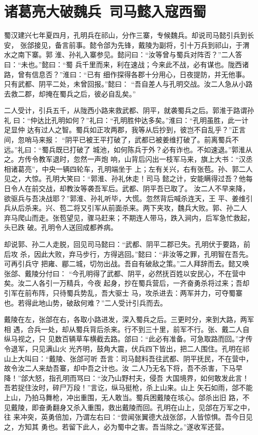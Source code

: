 \chapter{诸葛亮大破魏兵~司马懿入寇西蜀}

蜀汉建兴七年夏四月，孔明兵在祁山，分作三寨，专候魏兵。却说司马懿引兵到长安，
张郃接见，备言前事。懿令郃为先锋，戴陵为副将，引十万兵到祁山，于渭水之南下寨。郭
淮、孙礼入寨参见。懿问曰：“汝等曾与蜀兵对阵否？”二人答曰：“未也。”懿曰：“蜀
兵千里而来，利在速战；今来此不战，必有谋也。陇西诸路，曾有信息否？”淮曰：“已有
细作探得各郡十分用心，日夜提防，并无他事。只有武都、阴平二处，未曾回报。”懿曰：
“吾自差人与孔明交战。汝二人急从小路去救二郡，却掩在蜀兵之后，彼必自乱矣。”

二人受计，引兵五千，从陇西小路来救武都、阴平，就袭蜀兵之后。郭淮于路谓孙礼
曰：“仲达比孔明如何？”礼曰：“孔明胜仲达多矣。”淮曰：“孔明虽胜，此一计足显仲
达有过人之智。蜀兵如正攻两郡，我等从后抄到，彼岂不自乱乎？”正言间，忽哨马来报：
“阴平已被王平打破了，武都已被姜维打破了。前离蜀兵不远。”礼曰：“蜀兵既已打破了
城池，如何陈兵于外？必有诈也。不如速退。”郭淮从之。方传令教军退时，忽然一声炮
响，山背后闪出一枝军马来，旗上大书：“汉丞相诸葛亮”，中央一辆四轮车，孔明端坐于
上；左有关兴，右有张苞。孙、郭二人见之，大惊。孔明大笑曰：“郭淮、孙礼休走！司马
懿之计，安能瞒得过吾？他每日令人在前交战，却教汝等袭吾军后。武都、阴平吾已取了。
汝二人不早来降，欲驱兵与吾决战耶？”郭淮、孙礼听毕，大慌。忽然背后喊杀连天，王
平、姜维引兵从后杀来。兴、苞二将又引军从前面杀来。两下夹攻，魏兵大败。郭、孙二人
弃马爬山而走。张苞望见，骤马赶来；不期连人带马，跌入涧内，后军急忙救起，头已跌
破。孔明令人送回成都养病。

却说郭、孙二人走脱，回见司马懿曰：“武都、阴平二郡已失。孔明伏于要路，前后攻
杀，因此大败，弃马步行，方得逃回。”懿曰：“非汝等之罪，孔明智在吾先。可再引兵守
把雍、郿二城，切勿出战。吾自有破敌之策。”二人拜辞而去。懿又唤张郃、戴陵分付曰：
“今孔明得了武都、阴平，必然抚百姓以安民心，不在营中矣。汝二人各引一万精兵，今夜
起身，抄在蜀兵营后，一齐奋勇杀将过来；吾却引军在前布阵，只待蜀兵势乱，吾大驱士
马，攻杀进去：两军并力，可夺蜀寨也。若得此地山势，破敌何难？”二人受计引兵而去。

戴陵在左，张郃在右，各取小路进发，深入蜀兵之后。三更时分，来到大路，两军相
遇，合兵一处，却从蜀兵背后杀来。行不到三十里，前军不行。张、戴二人自纵马视之，只
见数百辆草车横截去路。郃曰：“此必有准备。可急取路而回。”才传令退军，只见满山火
光齐明，鼓角大震，伏兵四下皆出，把二人围住。孔明在祁山上大叫曰：“戴陵、张郃可听
吾言：司马懿料吾往武都、阴平抚民，不在营中，故令汝二人来劫吾寨，却中吾之计也。汝
二人乃无名下将，吾不杀害，下马早降！”郃大怒，指孔明而骂曰：“汝乃山野村夫，侵吾
大国境界，如何敢发此言！吾若捉住汝时，碎尸万段！”言讫，纵马挺枪，杀上山来。山上
矢石如雨，郃不能上山，乃拍马舞枪，冲出重围，无人敢当。蜀兵困戴陵在垓心。郃杀出旧
路，不见戴陵，即奋勇翻身又杀入重围，救出戴陵而回。孔明在山上，见郃在万军之中，往
来冲突，英勇倍加，乃谓左右曰：“尝闻张翼德大战张郃，人皆惊惧。吾今日见之，方知其
勇也。若留下此人，必为蜀中之害。吾当除之。”遂收军还营。

